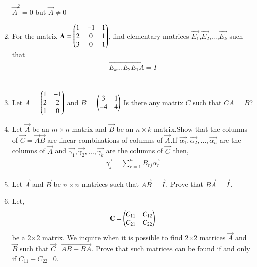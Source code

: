 \begin{enumerate}[label=\thesubsection.\arabic*.,ref=\thesubsection.\theenumi]
$\vec{A}^{2}=0$ but $\vec{A}\ne0$
%
\\
\solution

%
\item For the matrix $\mathbf{A}= \begin{pmatrix}1 & -1 & 1 \\ 2 & 0 & 1 \\ 3 & 0 & 1\end{pmatrix}$, find elementary matrices $\vec{E_1}$,$\vec{E_2}$,...,$\vec{E_k}$ such that
\begin{align}
	\vec{E_k...E_2E_1A = I}
\end{align}
%
\\
\solution

\item Let $A$ = $\begin{pmatrix}1 & -1\\2 & 2\\1 & 0\end{pmatrix}$ and $B$ = $\begin{pmatrix}3 & 1\\-4 & 4\end{pmatrix}$
Is there any matrix $C$ such that $CA$ = $B$?
\\
\solution

\item Let $\vec{A}$ be an $m \times n$ matrix and $\vec{B}$ be an $n \times k$ matrix.Show that the columns of $\vec{C}=\vec{A}\vec{B}$ are linear combinations of columns of $\vec{A}$.If $\vec{\alpha_1},\vec{\alpha_2},\hdots,\vec{\alpha_n}$ are the columns of $\vec{A}$ and $\vec{\gamma_1},\vec{\gamma_2},\hdots,\vec{\gamma_k}$ are the columns of $\vec{C}$ then,
\begin{align}
    \vec{\gamma_j}= \sum_{r=1}^{n}B_{rj}\vec{\alpha_r} 
\end{align}
%
\solution

%
\item Let $\vec{A}$ and $\vec{B}$ be $n \times n$ matrices such that $\vec{AB}=\vec{I}$. Prove that $\vec{BA}=\vec{I}$.
%
\solution

%
\item Let,
\begin{align}
\mathbf{C}=\begin{pmatrix}C_{11}&C_{12}\\C_{21}&C_{22}\end{pmatrix}
\end{align}
be a 2$\times$2 matrix. We inquire when it is possible to find 2$\times$2 matrices $\vec{A}$ and $\vec{B}$ such that $\vec{C}$=$\vec{AB-BA}$. Prove that such matrices can be found if and only if $C_{11}+C_{22}$=0.
%
\solution



\end{enumerate}

